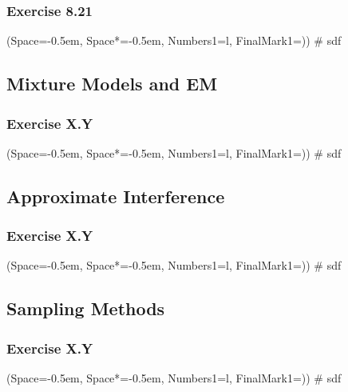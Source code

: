 \documentclass[12pt, a4paper]{article}
\newcommand{\listSpace}{-0.5em}%
\begin{document}
\subsubsection*{Exercise 8.21}
\begin{easylist}[enumerate]
	\ListProperties(Space=\listSpace, Space*=\listSpace, Numbers1=l, FinalMark1={)})
	# sdf
\end{easylist}

\subsection{Mixture Models and EM}
\subsubsection*{Exercise X.Y}
\begin{easylist}[enumerate]
	\ListProperties(Space=\listSpace, Space*=\listSpace, Numbers1=l, FinalMark1={)})
	# sdf
\end{easylist}

\subsection{Approximate Interference}
\subsubsection*{Exercise X.Y}
\begin{easylist}[enumerate]
	\ListProperties(Space=\listSpace, Space*=\listSpace, Numbers1=l, FinalMark1={)})
	# sdf
\end{easylist}

\subsection{Sampling Methods}
\subsubsection*{Exercise X.Y}
\begin{easylist}[enumerate]
	\ListProperties(Space=\listSpace, Space*=\listSpace, Numbers1=l, FinalMark1={)})
	# sdf
\end{easylist}

\end{document}
